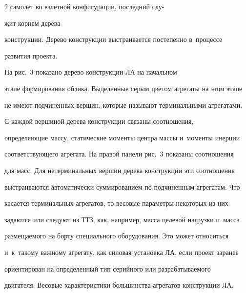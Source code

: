\begin{multicols}{2}
самолет во взлетной конфигурации, последний слу-\linebreak\vspace*{-12pt}





\columnbreak





\noindent


жит корнем дерева 


конструкции. Дерево конструкции выстраивается постепенно в~процессе 


развития проекта. 





На рис.~3 показано дерево конструкции ЛА на начальном 


этапе формирования облика. Выделенные серым цветом агрегаты на этом этапе 


не имеют подчиненных вершин, которые называют терминальными агрегатами.


  











  С каждой вершиной дерева конструкции связаны соотношения, 


определяющие массу, статические моменты цент\-ра массы и~моменты инерции 


соответствующего агрегата. На правой панели рис.~3 показаны соотношения 


для масс. Для нетерминальных вершин дерева конструкции эти соотношения 


выстраиваются автоматически суммированием по подчиненным агрегатам. Что 


касается терминальных агрегатов, то весовые па\-ра\-мет\-ры некоторых из них 


задаются или следуют из ТТЗ, как, например, масса целевой нагрузки и~масса 


размещаемого на борту специального оборудования. Это может относиться 


и~к~такому важ\-но\-му агрегату, как силовая установка ЛА, если проект заранее 


ориентирован на определенный тип серийного или раз\-ра\-ба\-ты\-ва\-емо\-го 


двигателя. Весовые характеристики большинства агрегатов конструкции ЛА, 



\end{multicols}
